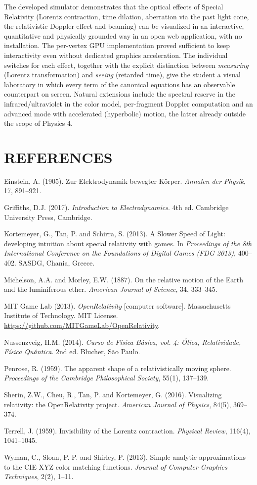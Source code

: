 \documentclass[10pt,a4paper,twocolumn]{article}
\newenvironment{referencias}
  {\section*{REFERENCES}\small
   \begin{list}{}{\setlength{\leftmargin}{1.4em}\setlength{\itemindent}{-1.4em}%
                  \setlength{\itemsep}{2pt}\setlength{\parsep}{0pt}}}
  {\end{list}}
\begin{document}
The developed simulator demonstrates that the optical effects of Special Relativity
(Lorentz contraction, time dilation, aberration via the past light cone, the relativistic
Doppler effect and beaming) can be visualized in an interactive, quantitative and
physically grounded way in an open web application, with no installation. The per-vertex
GPU implementation proved sufficient to keep interactivity even without dedicated
graphics acceleration. The individual switches for each effect, together with the
explicit distinction between \emph{measuring} (Lorentz transformation) and \emph{seeing}
(retarded time), give the student a visual laboratory in which every term of the
canonical equations has an observable counterpart on screen. Natural extensions include
the spectral reserve in the infrared/ultraviolet in the color model, per-fragment Doppler
computation and an advanced mode with accelerated (hyperbolic) motion, the latter already
outside the scope of Physics 4.

\begin{referencias}
  \item Einstein, A. (1905). Zur Elektrodynamik bewegter Körper. \emph{Annalen der
        Physik}, 17, 891--921.
  \item Griffiths, D.J. (2017). \emph{Introduction to Electrodynamics}. 4th ed.
        Cambridge University Press, Cambridge.
  \item Kortemeyer, G., Tan, P. and Schirra, S. (2013). A Slower Speed of Light:
        developing intuition about special relativity with games. In \emph{Proceedings of
        the 8th International Conference on the Foundations of Digital Games (FDG 2013)},
        400--402. SASDG, Chania, Greece.
  \item Michelson, A.A. and Morley, E.W. (1887). On the relative motion of the Earth and
        the luminiferous ether. \emph{American Journal of Science}, 34, 333--345.
  \item MIT Game Lab (2013). \emph{OpenRelativity} [computer software]. Massachusetts
        Institute of Technology. MIT License.
        \url{https://github.com/MITGameLab/OpenRelativity}.
  \item Nussenzveig, H.M. (2014). \emph{Curso de Física Básica, vol. 4: Ótica,
        Relatividade, Física Quântica}. 2nd ed. Blucher, São Paulo.
  \item Penrose, R. (1959). The apparent shape of a relativistically moving sphere.
        \emph{Proceedings of the Cambridge Philosophical Society}, 55(1), 137--139.
  \item Sherin, Z.W., Cheu, R., Tan, P. and Kortemeyer, G. (2016). Visualizing relativity:
        the OpenRelativity project. \emph{American Journal of Physics}, 84(5), 369--374.
  \item Terrell, J. (1959). Invisibility of the Lorentz contraction. \emph{Physical
        Review}, 116(4), 1041--1045.
  \item Wyman, C., Sloan, P.-P. and Shirley, P. (2013). Simple analytic approximations to
        the CIE XYZ color matching functions. \emph{Journal of Computer Graphics
        Techniques}, 2(2), 1--11.
\end{referencias}
\end{document}
